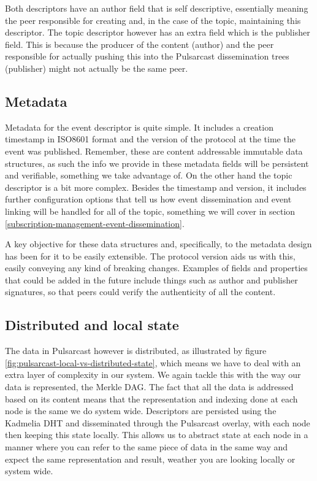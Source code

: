 Both descriptors have an author field that is self descriptive, essentially
meaning the peer responsible for creating and, in the case of the topic,
maintaining this descriptor. The topic descriptor however has an extra field
which is the publisher field. This is because the producer of the content
(author) and the peer responsible for actually pushing this into the Pulsarcast
dissemination trees (publisher) might not actually be the same peer.

\subsection{Metadata}\label{subsec:metadata}

Metadata for the event descriptor is quite simple. It includes a creation
timestamp in ISO8601 format and the version of the protocol at the time the
event was published. Remember, these are content addressable immutable data
structures, as such the info we provide in these metadata fields will be
persistent and verifiable, something we take advantage of. On the other hand
the topic descriptor is a bit more complex. Besides the timestamp and version,
it includes further configuration options that tell us how event dissemination
and event linking will be handled for all of the topic, something we will cover
in section \ref{subscription-management-event-dissemination}.

A key objective for these data structures and, specifically, to the metadata
design has been for it to be easily extensible. The protocol version aids us
with this, easily conveying any kind of breaking changes. Examples of fields
and properties that could be added in the future include things such as author
and publisher signatures, so that peers could verify the authenticity of all
the content.

\subsection{Distributed and local state}\label{subsec:distributed-and-local-state}

The data in Pulsarcast however is distributed, as illustrated by figure \ref{fig:pulsarcast-local-vs-distributed-state}, which means we have to deal with
an extra layer of complexity in our system. We again tackle this with the way
our data is represented, the Merkle DAG. The fact that all the data is
addressed based on its content means that the representation and indexing done
at each node is the same we do system wide. Descriptors are persisted using the
Kadmelia DHT and disseminated through the Pulsarcast overlay, with each node
then keeping this state locally. This allows us to abstract state at each node
in a manner where you can refer to the same piece of data in the same way and
expect the same representation and result, weather you are looking locally or
system wide.

